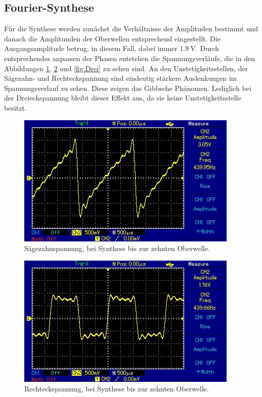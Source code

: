 \documentclass[
  bibliography=totoc,     %
  captions=tableheading,  %
  titlepage=firstiscover, %
]{scrartcl}
\begin{document}
\subsection{Fourier-Synthese}
Für die Synthese werden zunächst die Verhältnisse der Amplituden bestimmt und danach
die Amplitunden der Oberwellen entsprechend eingestellt. Die Ausgangsamplitude betrug,
in diesem Fall, dabei immer $\SI{1.9}{\volt}$.
Durch entsprechendes anpassen der Phasen entstehen die Spannungsverläufe, die in den
Abbildungen \ref{fig:Säge}, \ref{fig:Recht} und \ref{fig:Drei} zu sehen sind.
An den Unstetigkeitsstellen, der Sägezahn- und Rechteckspannung sind eindeutig
stärkere Auslenkungen im Spannungsverlauf zu sehen. Diese zeigen das Gibbsche Phänomen.
Lediglich bei der Dreieckspannung bleibt dieser Effekt aus, da sie keine Unstetigkeitsstelle
besitzt.
\begin{figure}
  \centering
  \includegraphics[width=\textwidth]{MAP002.jpg}
  \caption{Sägezahnspannung, bei Synthese bis zur zehnten Oberwelle.}
  \label{fig:Säge}
\end{figure}
\begin{figure}
  \centering
  \includegraphics[width=\textwidth]{MAP001.jpg}
  \caption{Rechteckspannung, bei Synthese bis zur zehnten Oberwelle.}
  \label{fig:Recht}
\end{figure}
\end{document}

